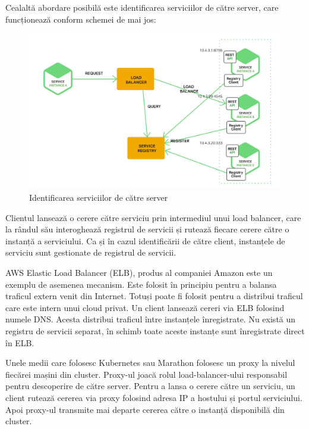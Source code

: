\documentclass[12pt, a4paper, oneside, romanian]{teza-upb}
\begin{document}
Cealaltă abordare posibilă este identificarea serviciilor de către server, care funcționează conform schemei de mai jos:

\begin{figure}[ht]
\centering
\includegraphics[scale=0.3]{img/Richardson-microservices-part4-3_server-side-pattern.png}
\caption{Identificarea serviciilor de către server}
\label{fig:arhi_componente}
\end{figure}

Clientul lansează o cerere către serviciu prin intermediul unui load balancer, care la rândul său interoghează registrul de servicii și rutează fiecare cerere către o instanță a serviciului. Ca și în cazul identificării de către client, instanțele de serviciu sunt gestionate de registrul de servicii. 

AWS Elastic Load Balancer (ELB), produs al companiei Amazon este un exemplu de asemenea mecanism. Este folosit în principiu pentru a balansa traficul extern venit din Internet. Totuși poate fi folosit pentru a distribui traficul care este intern unui cloud privat. Un client lansează cereri via ELB folosind numele DNS. Acesta distribui traficul între instanțele înregistrate. Nu există un registru de servicii separat, în schimb toate aceste instanțe sunt înregistrate direct în ELB.

Unele medii care folosesc Kubernetes sau Marathon folosesc un proxy la nivelul fiecărei mașini din cluster. Proxy-ul joacă rolul load-balancer-ului responsabil pentru descoperire de către server. Pentru a lansa o cerere către un serviciu, un client rutează cererea via proxy folosind adresa IP a hostului și portul serviciului. Apoi proxy-ul transmite mai departe cererea către o instanță disponibilă din cluster.
\end{document}
